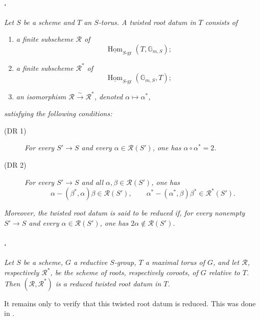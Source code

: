 \paragraph{.}
\textit{Let \(S\) be a scheme and \(T\) an \(S\)-torus. A
\emph{twisted root datum} in \(T\) consists of}
\begin{enumerate}
\item[(i)] \textit{a finite subscheme \(\mathcal R\) of}
  \[
    \underline{\operatorname{Hom}}_{S\text{-gr}}
      (T,\mathbb G_{m,S});
  \]
\item[(ii)] \textit{a finite subscheme \(\mathcal R^*\) of}
  \[
    \underline{\operatorname{Hom}}_{S\text{-gr}}
      (\mathbb G_{m,S},T);
  \]
\item[\SGAInlineRefTarget{sga3:xxii:def:1.9:item:iii}(iii)] \textit{an isomorphism
  \(\mathcal R\xrightarrow{\sim}\mathcal R^*\), denoted
  \(\alpha\mapsto\alpha^*\),}
\end{enumerate}
\textit{satisfying the following conditions:}
\begin{description}
\item[\textup{(DR 1)}]
  \textit{For every \(S'\to S\) and every
  \(\alpha\in\mathcal R(S')\), one has
  \(\alpha\circ\alpha^*=2\).}
\item[\textup{(DR 2)}]
  \textit{For every \(S'\to S\) and all
  \(\alpha,\beta\in\mathcal R(S')\), one has}
  \[
    \alpha-(\beta^*,\alpha)\beta\in\mathcal R(S'),
    \qquad
    \alpha^*-(\alpha^*,\beta)\beta^*\in\mathcal R^*(S').
  \]
\end{description}
\textit{Moreover, the twisted root datum is said to be
\emph{reduced} if, for every nonempty \(S'\to S\) and every
\(\alpha\in\mathcal R(S')\), one has
\(2\alpha\notin\mathcal R(S')\).}

\paragraph{.}
\textit{Let \(S\) be a scheme, \(G\) a reductive \(S\)-group, \(T\)
a maximal torus of \(G\), and let \(\mathcal R\), respectively
\(\mathcal R^*\), be the scheme of roots, respectively coroots, of
\(G\) relative to \(T\). Then \((\mathcal R,\mathcal R^*)\) is a
reduced twisted root datum in \(T\).}

It remains only to verify that this twisted root datum is reduced.
This was done in .

